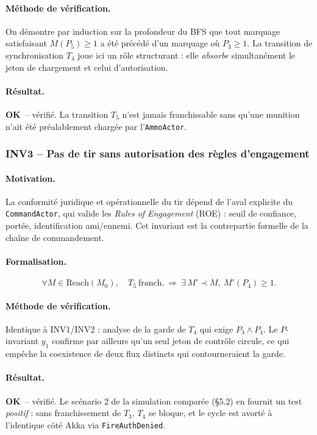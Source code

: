 \documentclass[11pt,a4paper]{article}
\newcommand{\code}[1]{\texttt{#1}}
\newcommand{\OK}{\textcolor{green!50!black}{\textbf{OK}}}
\begin{document}
\paragraph{Méthode de vérification.}
On démontre par induction sur la profondeur du BFS que tout marquage
satisfaisant $M(P_5) \geq 1$ a été précédé d'un marquage où $P_3 \geq 1$.
La transition de synchronisation $T_4$ joue ici un rôle structurant : elle
\emph{absorbe} simultanément le jeton de chargement et celui d'autorisation.

\paragraph{Résultat.}
\OK\ -- vérifié. La transition $T_5$ n'est jamais franchissable sans qu'une
munition n'ait été préalablement chargée par l'\code{AmmoActor}.

\subsubsection*{INV3 -- Pas de tir sans autorisation des règles d'engagement}

\paragraph{Motivation.}
La conformité juridique et opérationnelle du tir dépend de l'aval explicite
du \code{CommandActor}, qui valide les \emph{Rules of Engagement} (ROE) :
seuil de confiance, portée, identification ami/ennemi. Cet invariant est la
contrepartie formelle de la chaîne de commandement.

\paragraph{Formalisation.}
\[
\forall M \in \mathrm{Reach}(M_0),\quad T_5\ \text{franch.}\ \Longrightarrow\ \exists\, M' \prec M,\ M'(P_4) \geq 1.
\]

\paragraph{Méthode de vérification.}
Identique à INV1/INV2 : analyse de la garde de $T_4$ qui exige $P_3 \wedge P_4$.
Le $P$-invariant $y_1$ confirme par ailleurs qu'un seul jeton de contrôle
circule, ce qui empêche la coexistence de deux flux distincts qui
contourneraient la garde.

\paragraph{Résultat.}
\OK\ -- vérifié. Le scénario 2 de la simulation comparée (\S5.2) en fournit
un test \emph{positif} : sans franchissement de $T_3$, $T_4$ se bloque, et
le cycle est avorté à l'identique côté Akka via \code{FireAuthDenied}.
\end{document}

